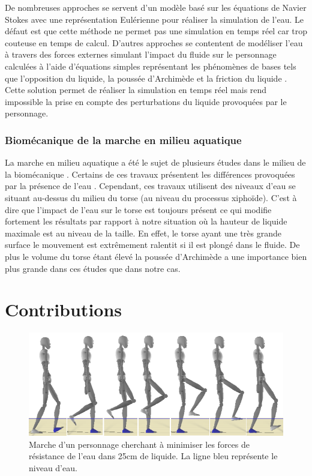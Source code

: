 \documentclass[runningheads,a4paper]{llncs}
\begin{document}
De nombreuses approches se servent d'un modèle basé sur les équations de Navier Stokes \cite{stam1999stable} avec une représentation Eulérienne \cite{si2014realistic} pour réaliser la simulation de l'eau. Le défaut est que cette méthode ne permet pas une simulation en temps réel car trop couteuse en temps de calcul. D'autres approches se contentent de modéliser l'eau à travers des forces externes simulant l'impact du fluide sur le personnage calculées à l'aide d'équations simples représentant les phénomènes de bases tels que l'opposition du liquide, la poussée d'Archimède et la friction du liquide \cite{yang2004layered}. Cette solution permet de réaliser la simulation en temps réel mais rend impossible la prise en compte des perturbations du liquide provoquées par le personnage.

\subsubsection{Biomécanique de la marche en milieu aquatique}
La marche en milieu aquatique a été le sujet de plusieurs études dans le milieu de la biomécanique \cite{barela2006biomechanical,chevutschi2009comparison,orselli2011joint,miyoshi2005functional}. Certains de ces travaux présentent les différences provoquées par la présence de l'eau \cite{barela2006biomechanical}. Cependant, ces travaux utilisent des niveaux d'eau se situant au-dessus du milieu du torse (au niveau du processus xiphoïde). C’est à dire que l'impact de l'eau sur le torse est toujours présent ce qui modifie fortement les résultats par rapport à notre situation où la hauteur de liquide maximale est au niveau de la taille. En effet, le torse ayant une très grande surface le mouvement est extrêmement ralentit si il est plongé dans le fluide. De plus le volume du torse étant élevé la poussée d'Archimède a une importance bien plus grande dans ces études que dans notre cas. 

\section{Contributions}
\label{sec:overview}

\vspace*{-0.5cm}
\begin{figure}[h]
\centering
\includegraphics[scale=0.55]{strips/min_drag_25cm.png}
\caption{Marche d'un personnage cherchant à minimiser les forces de résistance de l'eau dans 25cm de liquide. La ligne bleu représente le niveau d'eau.}
\label{fig:min_drag_25}
\end{figure}
\end{document}
